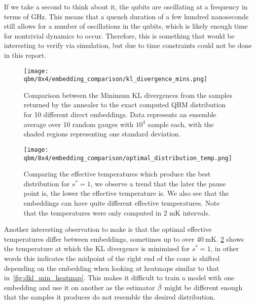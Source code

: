 If we take a second to think about it, the qubits are oscillating at a frequency in terms of GHz.
This means that a quench duration of a few hundred nanoseconds still allows for a number of oscillations in the qubits, which is likely enough time for nontrivial dynamics to occur.
Therefore, this is something that would be interesting to verify via simulation, but due to time constraints could not be done in this report.

\begin{figure}[!htb]
    \begin{center}
        \texttt{[image: qbm/8x4/embedding\_comparison/kl\_divergence\_mins.png]}
    \end{center}
    \caption{Comparison between the Minimum KL divergences from the samples returned by the annealer to the exact computed QBM distribution for 10 different direct embeddings. Data represents an ensemble average over 10 random gauges with \( 10^4 \) sample each, with the shaded regions representing one standard deviation.}
    \label{fig:dkl_mins_embeddings}
\end{figure}

\begin{figure}[!htb]
    \begin{center}
        \texttt{[image: qbm/8x4/embedding\_comparison/optimal\_distribution\_temp.png]}
    \end{center}
    \caption{Comparing the effective temperatures which produce the best distribution for \( s^* = 1 \), we observe a trend that the later the pause point is, the lower the effective temperature is. We also see that the embeddings can have quite different effective temperatures. Note that the temperatures were only computed in 2 \si{\milli\kelvin} intervals.}
    \label{fig:optimal_distribution_temp}
\end{figure}

Another interesting observation to make is that the optimal effective temperatures differ between embeddings, sometimes up to over \( 40 \ \si{\milli\kelvin} \).
\cref{fig:optimal_distribution_temp} shows the temperature at which the KL divergence is minimized for \( s^* = 1 \), in other words this indicates the midpoint of the right end of the cone is shifted depending on the embedding when looking at heatmaps similar to that in~\cref{fig:dkl_min_heatmap}.
This makes it difficult to train a model with one embedding and use it on another as the estimator \( \hat{\beta} \) might be different enough that the samples it produces do not resemble the desired distribution.

